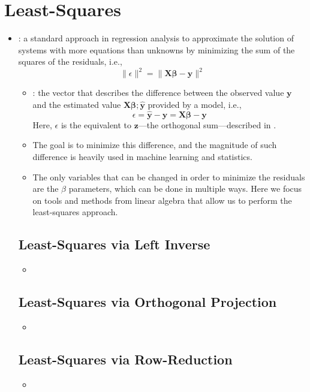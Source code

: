 \section{Least-Squares}\label{Least-Squares}
\begin{itemize}
  \item {}: a standard approach in regression analysis to approximate the solution of systems with more equations than unknowns by minimizing the sum of the squares of the residuals, i.e.,
  \[%
  \| \epsilon \|^2 = \| \bm{X\beta - y}\|^2
  \]%
    \begin{itemize}
      \item {}: the vector that describes the difference between the observed value \(\bm{y}\) and the estimated value \(\bm{X\beta}; \bm{\hat{y}}\) provided by a model, i.e.,
      \[%
      \epsilon = \bm{\hat{y}} - \bm{y} = \bm{X\beta - y}
      \]%
      Here, \(\epsilon\) is the equivalent to \(\bm{z}\)---the orthogonal sum---described in \hyperref[Finding Projections]{}.
      \item The goal is to minimize this difference, and the magnitude of such difference is heavily used in machine learning and statistics. 
      \item The only variables that can be changed in order to minimize the residuals are the \(\beta \) parameters, which can be done in multiple ways. Here we focus on tools and methods from linear algebra that allow us to perform the least-squares approach.
    \end{itemize}

  \subsection{Least-Squares via Left Inverse}\label{Least-Squares via Left Inverse}
  \begin{itemize}
    \item 
  \end{itemize}

  \subsection{Least-Squares via Orthogonal Projection}\label{Least-Squares via Orthogonal Projection}
  \begin{itemize}
    \item 
  \end{itemize}

  \subsection{Least-Squares via Row-Reduction}\label{Least-Squares via Row-Reduction}
  \begin{itemize}
    \item 
  \end{itemize}
  
\end{itemize}
